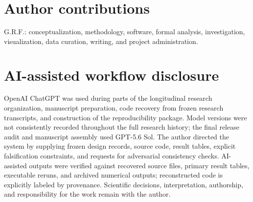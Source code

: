 \documentclass[aps,pre,preprint,superscriptaddress,nofootinbib]{revtex4-2}
\begin{document}
\section*{Author contributions}

G.R.F.: conceptualization, methodology, software, formal analysis, investigation, visualization, data curation, writing, and project administration.

\section*{AI-assisted workflow disclosure}

OpenAI ChatGPT was used during parts of the longitudinal research organization, manuscript preparation, code recovery from frozen research transcripts, and construction of the reproducibility package. Model versions were not consistently recorded throughout the full research history; the final release audit and manuscript assembly used GPT-5.6 Sol. The author directed the system by supplying frozen design records, source code, result tables, explicit falsification constraints, and requests for adversarial consistency checks. AI-assisted outputs were verified against recovered source files, primary result tables, executable reruns, and archived numerical outputs; reconstructed code is explicitly labeled by provenance. Scientific decisions, interpretation, authorship, and responsibility for the work remain with the author.
\end{document}
